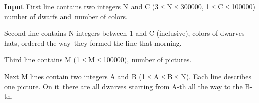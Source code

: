 \textbf{    Input   }
First line contains two integers N and C (3 ≤ N ≤ 300000, 1 ≤ C ≤ 100000) number of dwarfs and number of colors.  

   Second line contains N integers between 1 and C (inclusive), colors of dwarves hats, ordered the way they formed the line that morning.  

   Third line contains M (1 ≤ M ≤ 100000), number of pictures.  

   Next M lines contain two integers A and B (1 ≤ A ≤ B ≤ N). Each line describes one picture. On it there are all dwarves starting from A-th all the way to the B-th.